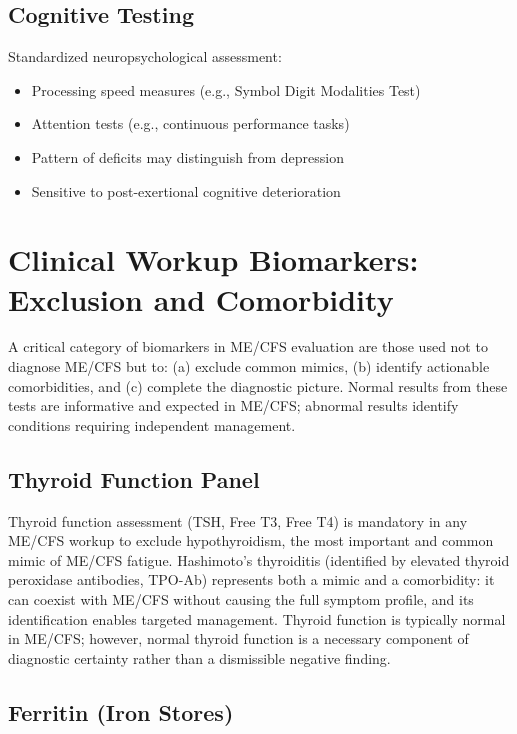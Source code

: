 \subsection{Cognitive Testing}

Standardized neuropsychological assessment:
\begin{itemize}
    \item Processing speed measures (e.g., Symbol Digit Modalities Test)
    \item Attention tests (e.g., continuous performance tasks)
    \item Pattern of deficits may distinguish from depression
    \item Sensitive to post-exertional cognitive deterioration
\end{itemize}

\section{Clinical Workup Biomarkers: Exclusion and Comorbidity}
\label{sec:clinical-workup-biomarkers}

A critical category of biomarkers in ME/CFS evaluation are those used not to diagnose ME/CFS but to: (a) exclude common mimics, (b) identify actionable comorbidities, and (c) complete the diagnostic picture. Normal results from these tests are informative and expected in ME/CFS; abnormal results identify conditions requiring independent management.

\subsection{Thyroid Function Panel}

Thyroid function assessment (TSH, Free T3, Free T4) is mandatory in any ME/CFS workup to exclude hypothyroidism, the most important and common mimic of ME/CFS fatigue. Hashimoto's thyroiditis (identified by elevated thyroid peroxidase antibodies, TPO-Ab) represents both a mimic and a comorbidity: it can coexist with ME/CFS without causing the full symptom profile, and its identification enables targeted management. Thyroid function is typically normal in ME/CFS; however, normal thyroid function is a necessary component of diagnostic certainty rather than a dismissible negative finding.

\subsection{Ferritin (Iron Stores)}

